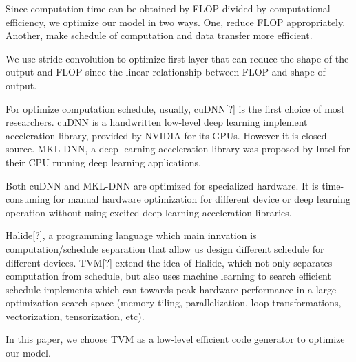\documentclass[runningheads]{llncs}
\begin{document}
Since computation time can be obtained by FLOP divided by computational efficiency, we optimize our model in two ways. One, reduce FLOP appropriately. Another, make schedule of computation and data transfer more efficient.




We use stride convolution to optimize first layer that can reduce the shape of the output and FLOP since the linear relationship between FLOP and shape of output.




For optimize computation schedule, usually, cuDNN[?] is the first choice of most researchers. cuDNN is a handwritten low-level deep learning implement acceleration library, provided by NVIDIA for its GPUs. However it is closed source. MKL-DNN, a deep learning acceleration library was proposed by Intel for their CPU running deep learning applications. 


Both cuDNN and MKL-DNN are optimized for specialized hardware. It is time-consuming for manual hardware optimization for different device or deep learning operation without using excited deep learning acceleration libraries.




Halide[?], a programming language which main innvation is computation/schedule separation that allow us design different schedule for different devices. TVM[?] extend the idea of Halide, which not only separates computation from schedule, but also uses machine learning to search efficient schedule implements which can towards peak hardware performance in a large optimization search space (memory tiling, parallelization, loop transformations, vectorization, tensorization, etc).


In this paper, we choose TVM as a low-level efficient code generator to optimize our model. 
\end{document}
